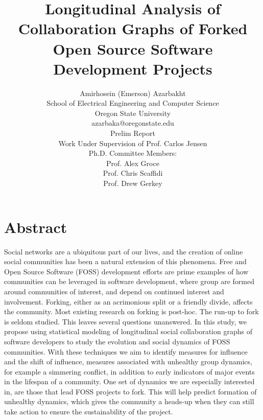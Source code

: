\documentclass{report}
\begin{document}
\title{Longitudinal Analysis of Collaboration Graphs of Forked Open Source Software Development Projects}

\author{Amirhosein (Emerson) Azarbakht\\
School of Electrical Engineering and Computer Science\\
Oregon State University\\
\vspace{5mm} %
azarbaka@oregonstate.edu\\
\vspace{5mm} %
Prelim Report\\
Work Under Supervision of Prof. Carlos Jensen\\
Ph.D. Committee Members:\\
Prof. Alex Groce\\
Prof. Chris Scaffidi\\
Prof. Drew Gerkey\\
}

\maketitle

\section{Abstract}
Social networks are a ubiquitous part of our lives, and the creation of online social communities has been a natural extension of this phenomena. Free and Open Source Software (FOSS) development efforts are prime examples of how communities can be leveraged in software development, where group are formed around communities of interest, and depend on continued interest and involvement. Forking, either as an acrimonious split or a friendly divide, affects the community. Most existing research on forking is post-hoc. The run-up to fork is seldom studied. This leaves several questions unanswered. In this study, we propose using statistical modeling of longitudinal social collaboration graphs of software developers to study the evolution and social dynamics of FOSS communities. With these techniques we aim to identify measures for influence and the shift of influence, measures associated with unhealthy group dynamics, for example a simmering conflict, in addition to early indicators of major events in the lifespan of a community. One set of dynamics we are especially interested in, are those that lead FOSS projects to fork. This will help predict formation of unhealthy dynamics, which gives the community a heads-up when they can still take action to ensure the sustainability of the project.
\end{document}
